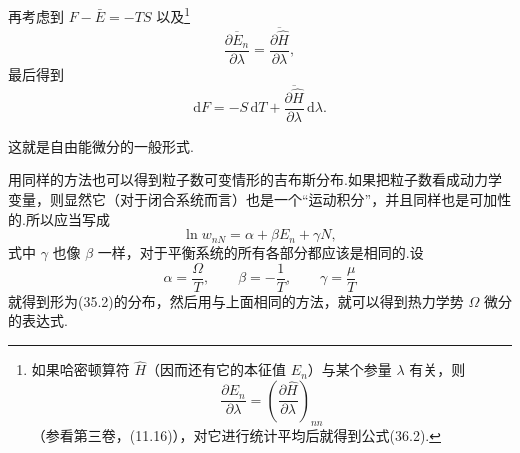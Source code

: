 再考虑到 $F-\bar{E}=-TS$ 以及\footnote{如果哈密顿算符 $\hat{H}$（因而还有它的本征值 $E_n$）与某个参量 $\lambda$ 有关，则
\begin{equation*}
  \frac{\partial E_n}{\partial\lambda}=\left(\frac{\partial\hat{H}}{\partial\lambda}\right)_{nn}
\end{equation*}
（参看第三卷，(11.16)），对它进行统计平均后就得到公式(36.2).}
\begin{equation}
  \overline{\frac{\partial E_n}{\partial\lambda}}=\overline{\frac{\partial\hat{H}}{\partial\lambda}},
\end{equation}
最后得到
\begin{equation*}
  \mathrm{d}F=-S\,\mathrm{d}T+\overline{\frac{\partial\hat{H}}{\partial\lambda}}\,\mathrm{d}\lambda.
\end{equation*}

这就是自由能微分的一般形式.

用同样的方法也可以得到粒子数可变情形的吉布斯分布.如果把粒子数看成动力学变量，则显然它（对于闭合系统而言）也是一个“运动积分”，并且同样也是可加性的.所以应当写成
\begin{equation}
  \ln w_{nN}=\alpha+\beta E_n+\gamma N,
\end{equation}
式中 $\gamma$ 也像 $\beta$ 一样，对于平衡系统的所有各部分都应该是相同的.设
\begin{equation*}
  \alpha=\frac{\Omega}{T},\qquad
  \beta=-\frac{1}{T},\qquad
  \gamma=\frac{\mu}{T}
\end{equation*}
就得到形为(35.2)的分布，然后用与上面相同的方法，就可以得到热力学势 $\Omega$ 微分的表达式.
